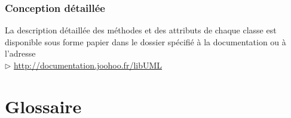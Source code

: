 \documentclass[12pt,a4paper,openany]{report}
\begin{document}
	\subsection{Conception détaillée}
	La description détaillée des méthodes et des attributs de chaque classe est disponible sous forme papier dans le dossier spécifié à la
	documentation ou à l'adresse \\
	$\rhd$ \url{http://documentation.joohoo.fr/libUML}
	
	\appendix
	\closeout\glossaireVar
	\chapter{Glossaire}
	\begin{sortedlist}
		
	\end{sortedlist}
\end{document}
